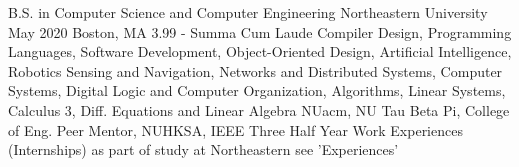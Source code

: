 

\begin{cveducation}
  \cvedu
    {B.S. in Computer Science and Computer Engineering} %
    {Northeastern University} %
    {May 2020} %
    {Boston, MA} %
    { 3.99 - Summa Cum Laude} %
    { %
    	Compiler Design,
        Programming Languages, 
        Software Development, 
        Object-Oriented Design,
        Artificial Intelligence, 
        Robotics Sensing and Navigation, 
   	 	Networks and Distributed Systems,
        Computer Systems,
     	Digital Logic and Computer Organization,
     	Algorithms, 
     	Linear Systems,
        Calculus 3,
     	Diff. Equations and Linear Algebra
    }
    { %
        NUacm,
        NU Tau Beta Pi,
        College of Eng. Peer Mentor,
        NUHKSA,
        IEEE
    }
    { %
      Three Half Year Work Experiences (Internships) as part of
      study at Northeastern see 'Experiences'
    }
\end{cveducation}
